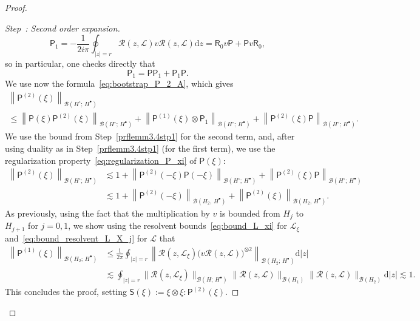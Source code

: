 \documentclass[AHL,Unicode,longabstracts,published]{cedram}
\renewcommand{\d}{\mathrm{d}}
\newcommand{\sfR}{\mathsf{R}}
\newcommand{\sfS}{\mathsf{S}}
\newcommand{\LL}{\mathcal{L}}
\newcommand{\PP}{\mathsf{P}}
\newcommand{\RR}{\mathcal{R}}
\newcommand{\BBB}{\mathscr{B}}
\newcommand{\Ss}{H}
\newcommand{\Ssp}{H^{\bullet}}
\newcommand{\Ssm}{H^{\circ}}
\renewcommand*\le{\leqslant}
\newcounter{stepcount}
\newenvironment{step}[1]{\refstepcounter{stepcount}\begin{proof}[Step~\thestepcount: #1]}{\let\qed\relax\end{proof}}
\begin{document}
\begin{proof}
\begin{step}{{Second order expansion}}
\begin{equation*}
\PP_{1} = - \frac{1}{2 i \pi} \oint_{|z| = r} \RR(z,\LL) v \RR(z,\LL) \d z = \sfR_{0} v \PP + \PP v \sfR_{0},
\end{equation*}
so in particular, one checks directly that
\[
\PP_{1} = \PP \PP_{1} + \PP_{1} \PP.
\]
We use now the formula~\eqref{eq:bootstrap_P_2_A}, which gives
\begin{multline*}
\left\| \PP^{(2)}(\xi) \right\|_{\BBB(\Ssm ;\,\Ssp)}  \\
\le \left\| \PP(\xi) \PP^{(2)}(\xi) \right\|_{\BBB(\Ssm ;\,\Ssp)} + \left\| \PP^{(1)}(\xi) \otimes \PP_{1} \right\|_{\BBB(\Ssm ;\,\Ssp)}
+ \left\| \PP^{(2)}(\xi) \PP \right\|_{\BBB(\Ssm;\,\Ssp)}.
\end{multline*}
We use the bound from Step~\ref{prflemm3.4stp1} for the second term, and, after using duality as in Step~\ref{prflemm3.4stp1} (for the first term), we use the regularization property~\eqref{eq:regularization_P_xi} of $\PP(\xi)$:
\begin{align*}
\left\| \PP^{(2)}(\xi) \right\|_{\BBB(\Ssm ;\,\Ssp)} & \lesssim 1 + \left\| \PP^{(2)}(-\xi) \PP(-\xi) \right\|_{\BBB(\Ssm ;\,\Ssp)} + \left\| \PP^{(2)}(\xi) \PP \right\|_{\BBB(\Ssm ;\,\Ssp)} \\
& \lesssim 1 + \left\| \PP^{(2)}(-\xi) \right\|_{\BBB(\Ss_{2},\,\Ssp)} + \left\| \PP^{(2)}(\xi) \right\|_{\BBB(\Ss_{2},\,\Ssp)}.
\end{align*}
As previously, using the fact that the multiplication by $v$ is bounded from $\Ss_{j}$ to $\Ss_{j+1}$ for $j=0,1$, we show using the resolvent bounds~\eqref{eq:bound_L_xi} for $\LL_\xi$ and~\eqref{eq:bound_resolvent_L_X_j} for $\LL$ that
\begin{align*}
\left\| \PP^{(1)}(\xi) \right\|_{\BBB(\Ss_{2} ;\,\Ssp)} & \le \frac{1}{2 \pi} \oint_{|z|=r} \left\| \RR(z,\LL_{\xi}) \Big(v \RR(z,\LL)\Big)^{\otimes 2} \right\|_{\BBB(\Ss_{2} ;\,\Ssp) } \d|z |\\
& \lesssim \oint_{|z|=r} \| \RR(z,\LL_{\xi}) \|_{\BBB(\Ss ;\,\Ssp) } \| \RR(z,\LL) \|_{\BBB(\Ss_{1})} \| \RR(z,\LL) \|_{\BBB(\Ss_{2})} \d| z|\lesssim 1.
\end{align*}
This concludes the proof, setting $\sfS(\xi) := \xi \otimes \xi : \PP^{(2)}(\xi)$.\qedhere
\end{step}\let\qed\relax
\end{proof}
\end{document}
